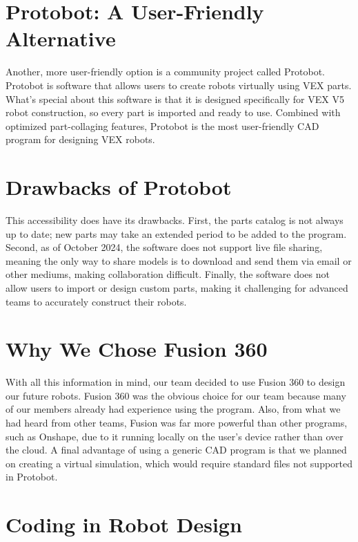 \section*{Protobot: A User-Friendly Alternative}  
Another, more user-friendly option is a community project called Protobot. Protobot is software that allows users to create robots virtually using VEX parts. What’s special about this software is that it is designed specifically for VEX V5 robot construction, so every part is imported and ready to use. Combined with optimized part-collaging features, Protobot is the most user-friendly CAD program for designing VEX robots.

\section*{Drawbacks of Protobot}  
This accessibility does have its drawbacks. First, the parts catalog is not always up to date; new parts may take an extended period to be added to the program. Second, as of October 2024, the software does not support live file sharing, meaning the only way to share models is to download and send them via email or other mediums, making collaboration difficult. Finally, the software does not allow users to import or design custom parts, making it challenging for advanced teams to accurately construct their robots.

\section*{Why We Chose Fusion 360}  
With all this information in mind, our team decided to use Fusion 360 to design our future robots. Fusion 360 was the obvious choice for our team because many of our members already had experience using the program. Also, from what we had heard from other teams, Fusion was far more powerful than other programs, such as Onshape, due to it running locally on the user’s device rather than over the cloud. A final advantage of using a generic CAD program is that we planned on creating a virtual simulation, which would require standard files not supported in Protobot.

\section*{Coding in Robot Design}

